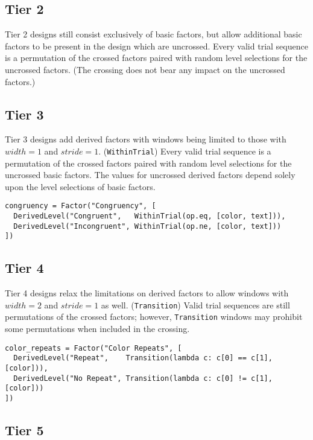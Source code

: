 \subsection{Tier 2}

Tier 2 designs still consist exclusively of basic factors, but allow additional basic factors to be present in the design which are uncrossed. Every valid trial sequence is a permutation of the crossed factors paired with random level selections for the uncrossed factors. (The crossing does not bear any impact on the uncrossed factors.)

\subsection{Tier 3}

Tier 3 designs add derived factors with windows being limited to those with $width=1$ and $stride=1$. (\texttt{WithinTrial}) Every valid trial sequence is a permutation of the crossed factors paired with random level selections for the uncrossed basic factors. The values for uncrossed derived factors depend solely upon the level selections of basic factors.

\begin{verbatim}
congruency = Factor("Congruency", [
  DerivedLevel("Congruent",   WithinTrial(op.eq, [color, text])),
  DerivedLevel("Incongruent", WithinTrial(op.ne, [color, text]))
])
\end{verbatim}

\subsection{Tier 4}

Tier 4 designs relax the limitations on derived factors to allow windows with $width=2$ and $stride=1$ as well. (\texttt{Transition}) Valid trial sequences are still permutations of the crossed factors; however, \texttt{Transition} windows may prohibit some permutations when included in the crossing.

\begin{verbatim}
color_repeats = Factor("Color Repeats", [
  DerivedLevel("Repeat",    Transition(lambda c: c[0] == c[1], [color])),
  DerivedLevel("No Repeat", Transition(lambda c: c[0] != c[1], [color]))
])
\end{verbatim}

\subsection{Tier 5}

